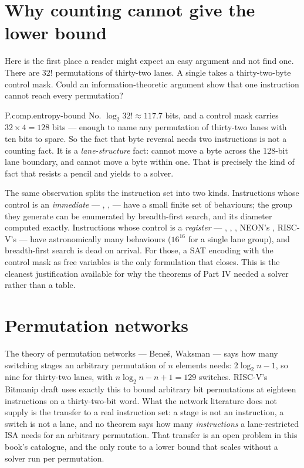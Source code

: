 \section{Why counting cannot give the lower bound}
\label{sec:entropy}

Here is the first place a reader might expect an easy argument and not find one. There are \(32!\) permutations of thirty-two lanes. A single  takes a thirty-two-byte control mask. Could an information-theoretic argument show that one instruction cannot reach every permutation?

\begin{artifact}{P.comp.entropy-bound}
No. \(\log_2 32! \approx 117.7\) bits, and a  control mask carries \(32 \times 4 = 128\) bits --- enough to name any permutation of thirty-two lanes with ten bits to spare. So the fact that byte reversal needs two instructions is not a counting fact. It is a \emph{lane-structure} fact:  cannot move a byte across the 128-bit lane boundary, and  cannot move a byte within one. That is precisely the kind of fact that resists a pencil and yields to a solver.
\end{artifact}

\begin{keyidea}[title={Immediates versus registers}]
The same observation splits the instruction set into two kinds. Instructions whose control is an \emph{immediate} --- , ,  --- have a small finite set of behaviours; the group they generate can be enumerated by breadth-first search, and its diameter computed exactly. Instructions whose control is a \emph{register} --- , , , NEON's , RISC-V's  --- have astronomically many behaviours (\(16^{16}\) for a single  lane group), and breadth-first search is dead on arrival. For those, a SAT encoding with the control mask as free variables is the only formulation that closes. This is the cleanest justification available for why the theorems of Part IV needed a solver rather than a table.
\end{keyidea}

\section{Permutation networks}
\label{sec:networks}

The theory of permutation networks --- Beneš, Waksman --- says how many switching stages an arbitrary permutation of \(n\) elements needs: \(2\log_2 n - 1\), so nine for thirty-two lanes, with \(n\log_2 n - n + 1 = 129\) switches. RISC-V's Bitmanip draft uses exactly this to bound arbitrary bit permutations at eighteen instructions on a thirty-two-bit word. What the network literature does not supply is the transfer to a real instruction set: a stage is not an instruction, a switch is not a lane, and no theorem says how many \emph{instructions} a lane-restricted ISA needs for an arbitrary permutation. That transfer is an open problem in this book's catalogue, and the only route to a lower bound that scales without a solver run per permutation.

